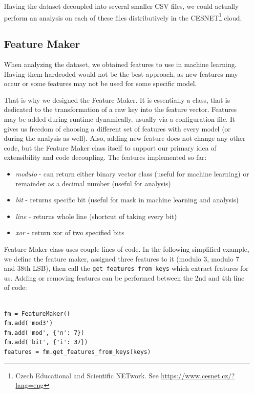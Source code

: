 Having the dataset decoupled into several smaller CSV files, we could actually perform an analysis on each of these files distributively in the CESNET\footnote{Czech Educational and Scientific NETwork. See \url{https://www.cesnet.cz/?lang=eng}} cloud.

\subsection*{Feature Maker}

\label{feature-maker}

When analyzing the dataset, we obtained features to use in machine learning. Having them hardcoded would not be the best approach, as new features may occur or some features may not be used for some specific model. 

That is why we designed the Feature Maker. It is essentially a class, that is dedicated to the transformation of a raw key into the feature vector. Features may be added during runtime dynamically, usually via a configuration file. It gives us freedom of choosing a different set of features with every model (or during the analysis as well). Also, adding new feature does not change any other code, but the Feature Maker class itself to support our primary idea of extensibility and code decoupling. The features implemented so far:

\begin{itemize}

\item \textit{modulo} - can return either binary vector class (useful for machine learning) or remainder as a decimal number (useful for analysis)
\item \textit{bit} - returns specific bit (useful for mask in machine learning and analysis)
\item \textit{line} - returns whole line (shortcut of taking every bit)
\item \textit{xor} - return xor of two specified bits

\end{itemize}

\noindent
Feature Maker class uses couple lines of code. In the following simplified example, we define the feature maker, assigned three features to it (modulo 3, modulo 7 and 38th LSB), then call the \texttt{get\_features\_from\_keys} which extract features for us. Adding or removing features can be performed between the 2nd and 4th line of code:

\begin{verbatim}

fm = FeatureMaker()
fm.add('mod3')
fm.add('mod', {'n': 7})
fm.add('bit', {'i': 37})
features = fm.get_features_from_keys(keys)

\end{verbatim}

